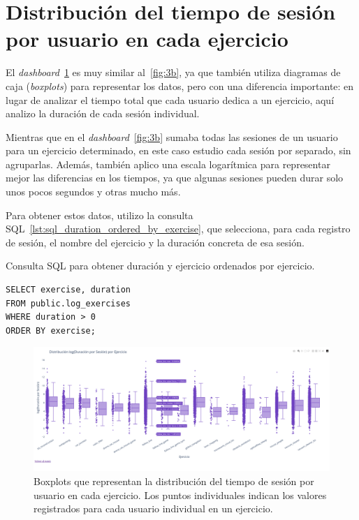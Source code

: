 \documentclass[a4paper, 12pt]{book}
\begin{document}
\section{Distribución del tiempo de sesión por usuario en cada ejercicio}
\label{sec:dash3c}

El \textit{dashboard}~\ref{fig:3c} es muy similar al~\ref{fig:3b}, ya que también utiliza diagramas de caja (\textit{boxplots}) para representar los datos, pero con una diferencia importante: en lugar de analizar el tiempo total que cada usuario dedica a un ejercicio, aquí analizo la duración de cada sesión individual.

Mientras que en el \textit{dashboard}~\ref{fig:3b} sumaba todas las sesiones de un usuario para un ejercicio determinado, en este caso estudio cada sesión por separado, sin agruparlas. Además, también aplico una escala logarítmica para representar mejor las diferencias en los tiempos, ya que algunas sesiones pueden durar solo unos pocos segundos y otras mucho más.

Para obtener estos datos, utilizo la consulta SQL~\ref{lst:sql_duration_ordered_by_exercise}, que selecciona, para cada registro de sesión, el nombre del ejercicio y la duración concreta de esa sesión.

\begin{listing}[h!]
\caption{Consulta SQL para obtener duración y ejercicio ordenados por ejercicio.}
\label{lst:sql_duration_ordered_by_exercise}
\begin{verbatim}
SELECT exercise, duration
FROM public.log_exercises
WHERE duration > 0
ORDER BY exercise;
\end{verbatim}
\end{listing}

\begin{figure}[H]
  \centering
  \includegraphics[width=1.1\textwidth]{img/3c.png}
  \caption{Boxplots que representan la distribución del tiempo de sesión por usuario en cada ejercicio. Los puntos individuales indican los valores registrados para cada usuario individual en un ejercicio.}
  \label{fig:3c}
\end{figure}
\end{document}
